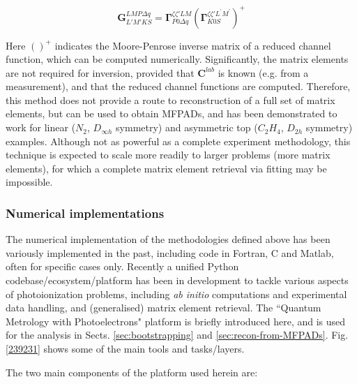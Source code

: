 \documentclass[10pt]{article}
\begin{document}
\begin{equation}
\mathbf{G}_{L'M'KS}^{LMP\Delta q}=\mathbf{\Gamma}_{P0\Delta q}^{\zeta\zeta'LM}(\mathbf{\Gamma}_{K0S}^{\zeta\zeta'L^{\prime}M^{\prime}})^{+}
\label{eq:MPinversion}
\end{equation}

Here $()^{+}$ indicates the Moore-Penrose inverse matrix of a reduced channel function, which can be computed numerically. Significantly, the matrix elements are not required for inversion, provided that $\mathbf{C}^{lab}$ is known (e.g. from a measurement), and that the reduced channel functions are computed. Therefore, this method does not provide a route to reconstruction of a full set of matrix elements, but can be used to obtain MFPADs, and has been demonstrated to work for linear ($N_2$, $D_{\infty h}$ symmetry) and 
asymmetric top ($C_{2}H_{4}$, $D_{2h}$ symmetry) examples. Although not as powerful as a complete experiment methodology, this technique is expected to scale more readily to larger problems (more matrix elements), for which a complete matrix element retrieval via fitting may be impossible. 


\subsubsection{Numerical implementations\label{sec:numerics-intro}}

The numerical implementation of the methodologies defined above has been variously implemented in the past, including code in Fortran, C and Matlab, often for specific cases only. Recently a unified Python codebase/ecosystem/platform has been in development to tackle various aspects of photoionization problems, including \textit{ab initio} computations and experimental data handling, and (generalised) matrix element retrieval. The ``Quantum Metrology with Photoelectrons"  platform is briefly introduced here, and is used for the analysis in Sects. \ref{sec:bootstrapping} and \ref{sec:recon-from-MFPADs}. Fig. \ref{239231} shows some of the main tools and tasks/layers. 

The two main components of the platform used herein are:
\end{document}
